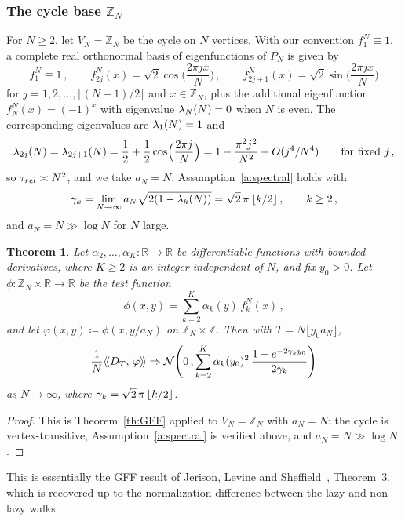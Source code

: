 \documentclass[11pt,a4paper,reqno]{amsart}
\newtheorem{Theorem}{Theorem}[section]
\theoremstyle{definition}
\newcommand{\cN}{\ensuremath{\mathcal N}}
\newcommand{\bbR}{{\ensuremath{\mathbb R}} }
\newcommand{\bbZ}{{\ensuremath{\mathbb Z}} }
\newcommand{\laa}{\langle \! \langle}
\newcommand{\raa}{\rangle \! \rangle}
\let\a=\alpha \let\b=\beta   \let\d=\delta  \let\e=\varepsilon
\begin{document}
\subsubsection{The cycle base $\bbZ_N$}
For $N \geq 2$, let $V_N = \bbZ_N$ be the cycle on $N$ vertices. With our convention $f_1^N \equiv 1$, a complete real orthonormal basis of eigenfunctions of $P_N$ is given by
\begin{equation}\label{eq:fj}
	f_1^N \equiv 1\,, \qquad f_{2j}^N(x) = \sqrt{2} \cos\!\Big(\frac{2\pi j x}{N}\Big)\,, \qquad f_{2j+1}^N(x) = \sqrt{2} \sin\!\Big(\frac{2\pi j x}{N}\Big)
\end{equation}
for $j = 1, 2, \ldots, \lfloor (N-1)/2\rfloor$ and $x \in \bbZ_N$, plus the additional eigenfunction $f_N^N(x) = (-1)^x$ with eigenvalue $\lambda_N(N) = 0$ when $N$ is even. The corresponding eigenvalues are $\lambda_1(N) = 1$ and
	\[ \lambda_{2j}(N) = \lambda_{2j+1}(N) = \frac{1}{2} + \frac{1}{2}\cos\!\Big(\frac{2\pi j}{N}\Big) = 1 - \frac{\pi^2 j^2}{N^2} + O(j^4/N^4) \qquad \text{for fixed } j\,, \]
so $\tau_{rel} \asymp N^2$, and we take $a_N = N$. Assumption~\ref{a:spectral} holds with
	\[ \gamma_k = \lim_{N \to \infty} a_N \sqrt{2(1 - \lambda_k(N))} = \sqrt{2}\,\pi\,\lfloor k/2 \rfloor\,, \qquad k \geq 2\,, \]
and $a_N = N \gg \log N$ for $N$ large.


\begin{Theorem}\label{thm:cycle}
Let $\a_2, \ldots, \a_K : \bbR \to \bbR$ be differentiable functions with bounded derivatives, where $K \geq 2$ is an integer independent of $N$, and fix $y_0 > 0$. Let $\phi : \bbZ_N \times \bbR \to \bbR$ be the test function
	\[ \phi(x, y) = \sum_{k=2}^K \a_k(y)\, f_k^N(x)\,, \]
and let $\varphi(x,y) \coloneqq \phi(x, y/a_N)$ on $\bbZ_N \times \bbZ$. Then with $T = N \lfloor y_0 a_N \rfloor$,
	\[ \frac{1}{N} \laa D_T,\, \varphi \raa
	\Rightarrow \cN\!\left( 0\,, \sum_{k=2}^K \a_k(y_0)^2\, \frac{1 - e^{-2\g_k y_0}}{2 \g_k} \right) \]
as $N \to \infty$, where $\gamma_k = \sqrt{2}\,\pi\,\lfloor k/2 \rfloor$.
\end{Theorem}


\begin{proof}
This is Theorem~\ref{th:GFF} applied to $V_N = \bbZ_N$ with $a_N = N$: the cycle is vertex-transitive, Assumption~\ref{a:spectral} is verified above, and $a_N = N \gg \log N$.
\end{proof}

This is essentially the GFF result of Jerison, Levine and Sheffield~\cite{jerison2014internal2}, Theorem~3, which is recovered up to the normalization difference between the lazy and non-lazy walks.
\end{document}

